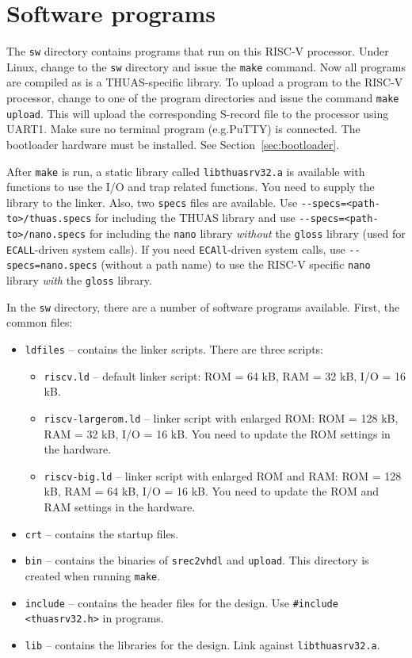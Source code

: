 \documentclass[12pt]{article}
\begin{document}
\section{Software programs}
The \lstinline|sw| directory contains programs that run on this RISC-V processor. Under Linux, change to the \lstinline|sw| directory and issue the \lstinline|make| command. Now all programs are compiled as is a THUAS-specific library. To upload a program to the RISC-V processor, change to one of the program directories and issue the command \lstinline|make upload|. This will upload the corresponding S-record file to the processor using UART1. Make sure no terminal program (e.g.\@ PuTTY) is connected. The bootloader hardware must be installed. See Section~\ref{sec:bootloader}.

After \lstinline|make| is run, a static library called \lstinline|libthuasrv32.a| is available with functions to use the I/O and trap related functions. You need to supply the library to the linker. Also, two \lstinline|specs| files are available. Use \lstinline|--specs=<path-to>/thuas.specs| for including the THUAS library and use \lstinline|--specs=<path-to>/nano.specs| for including the \lstinline|nano| library \textsl{without} the \lstinline|gloss| library (used for \lstinline|ECALL|-driven system calls). If you need \lstinline|ECAll|-driven system calls, use \lstinline|--specs=nano.specs| (without a path name) to use the RISC-V specific \lstinline|nano| library \textsl{with} the \lstinline|gloss| library.

In the \lstinline|sw| directory, there are a number of software programs available. First, the common files:

\begin{itemize}
\item \lstinline|ldfiles| -- contains the linker scripts. There are three scripts:
\begin{itemize}
\item \lstinline|riscv.ld| -- default linker script: ROM = 64 kB, RAM = 32 kB, I/O = 16 kB.
\item \lstinline|riscv-largerom.ld| -- linker script with enlarged ROM: ROM = 128 kB, RAM = 32 kB, I/O = 16 kB. You need to update the ROM settings in the hardware.
\item \lstinline|riscv-big.ld| -- linker script with enlarged ROM and RAM: ROM = 128 kB, RAM = 64 kB, I/O = 16 kB. You need to update the ROM and RAM settings in the hardware.
\end{itemize}
\item \lstinline|crt| -- contains the startup files.
\item \lstinline|bin| -- contains the binaries of \lstinline|srec2vhdl| and \lstinline|upload|. This directory is created when running \lstinline|make|.
\item \lstinline|include| -- contains the header files for the design. Use \lstinline|#include <thuasrv32.h>| in programs.
\item \lstinline|lib| -- contains the libraries for the design. Link against \lstinline|libthuasrv32.a|.
\end{itemize}
\end{document}
